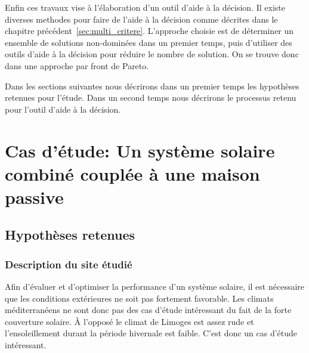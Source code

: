 Enfin ces travaux vise à l’élaboration d’un outil d’aide à la décision. Il existe
diverses methodes pour faire de l’aide à la décision comme décrites dans le chapitre
précédent~\autoref{sec:multi_critere}. L’approche choisie est de déterminer un
ensemble de solutions non-dominées dans un premier temps, puis d’utiliser des
outils d’aide à la décision pour réduire le nombre de solution. On se trouve donc
dans une approche par front de Pareto.


Dans les sections suivantes nous décrirons dans un premier temps les hypothèses
retenues pour l’étude. Dans un second temps nous décrirons le processus retenu
pour l’outil d’aide à la décision.






\section{Cas d’étude: Un système solaire combiné couplée à une maison passive} %
\label{sec:cas_d_etude_un_systeme_solaire_combine_couplee_a_une_maison_passive}
\subsection{Hypothèses retenues} %
\label{sub:hypotheses_retenues}
\subsubsection{Description du site étudié} %
\label{ssub:description_du_site_etudie}
Afin d’évaluer et d’optimiser la performance d’un système solaire, il est nécessaire
que les conditions extérieures ne soit pas fortement favorable.
Les climats méditerranéens ne sont donc pas des cas d’étude intéressant du fait
de la forte couverture solaire.
À l’opposé le climat de Limoges est assez rude et l’ensoleillement durant la période
hivernale est faible. C’est donc un cas d’étude intéressant.



